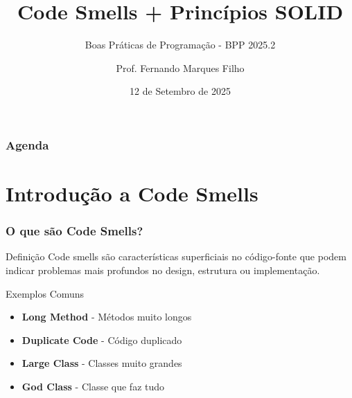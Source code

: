\documentclass[aspectratio=169]{beamer}
\title{Code Smells + Princípios SOLID}
\subtitle{Boas Práticas de Programação - BPP 2025.2}
\author{Prof. Fernando Marques Filho}
\institute{Universidade Federal do Rio Grande do Norte}
\date{12 de Setembro de 2025}
\begin{document}
\frame{\titlepage}

\begin{frame}
\frametitle{Agenda}
\tableofcontents
\end{frame}

\section{Introdução a Code Smells}

\begin{frame}
\frametitle{O que são Code Smells?}
\begin{center}
\end{center}

\begin{block}{Definição}
\vspace{0.1cm}
\footnotesize
Code smells são características superficiais no código-fonte que podem indicar problemas mais profundos no design, estrutura ou implementação.
\end{block}


\begin{exampleblock}{\small{Exemplos Comuns}}
\footnotesize
\begin{itemize}
    \item \textbf{Long Method} - Métodos muito longos
    \item \textbf{Duplicate Code} - Código duplicado
    \item \textbf{Large Class} - Classes muito grandes
    \item \textbf{God Class} - Classe que faz tudo
\end{itemize}
\end{exampleblock}
\end{frame}
\end{document}
